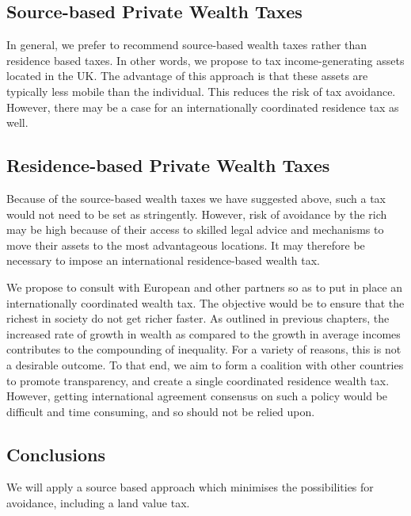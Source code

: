 \documentclass[]{tufte-handout}
\begin{document}
\hypertarget{source-based-private-wealth-taxes}{%
\subsection{Source-based Private Wealth
Taxes}\label{source-based-private-wealth-taxes}}

In general, we prefer to recommend source-based wealth taxes rather than
residence based taxes. In other words, we propose to tax
income-generating assets located in the UK. The advantage of this
approach is that these assets are typically less mobile than the
individual. This reduces the risk of tax avoidance. However, there may
be a case for an internationally coordinated residence tax as well.

\hypertarget{residence-based-private-wealth-taxes}{%
\subsection{Residence-based Private Wealth
Taxes}\label{residence-based-private-wealth-taxes}}

Because of the source-based wealth taxes we have suggested above, such a
tax would not need to be set as stringently. However, risk of avoidance
by the rich may be high because of their access to skilled legal advice
and mechanisms to move their assets to the most advantageous locations.
It may therefore be necessary to impose an international residence-based
wealth tax.

We propose to consult with European and other partners so as to put in
place an internationally coordinated wealth tax. The objective would be
to ensure that the richest in society do not get richer faster. As
outlined in previous chapters, the increased rate of growth in wealth as
compared to the growth in average incomes contributes to the compounding
of inequality. For a variety of reasons, this is not a desirable
outcome. To that end, we aim to form a coalition with other countries to
promote transparency, and create a single coordinated residence wealth
tax. However, getting international agreement consensus on such a policy
would be difficult and time consuming, and so should not be relied upon.

\hypertarget{conclusions-4}{%
\subsection{Conclusions}\label{conclusions-4}}

We will apply a source based approach which minimises the possibilities
for avoidance, including a land value tax.
\end{document}
